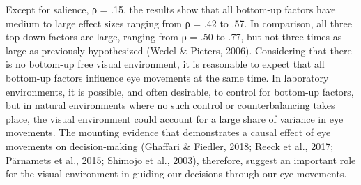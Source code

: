 \documentclass{article}
\begin{document}
Except for salience, ρ = .15, the results show that all bottom-up factors have medium to large effect sizes ranging from ρ = .42 to .57. In comparison, all three top-down factors are large, ranging from ρ = .50 to .77, but not three times as large as previously hypothesized (Wedel \& Pieters, 2006). Considering that there is no bottom-up free visual environment, it is reasonable to expect that all bottom-up factors influence eye movements at the same time. In laboratory environments, it is possible, and often desirable, to control for bottom-up factors, but in natural environments where no such control or counterbalancing takes place, the visual environment could account for a large share of variance in eye movements. The mounting evidence that demonstrates a causal effect of eye movements on decision-making (Ghaffari \& Fiedler, 2018; Reeck et al., 2017; Pärnamets et al., 2015; Shimojo et al., 2003), therefore, suggest an important role for the visual environment in guiding our decisions through our eye movements. 
\end{document}

